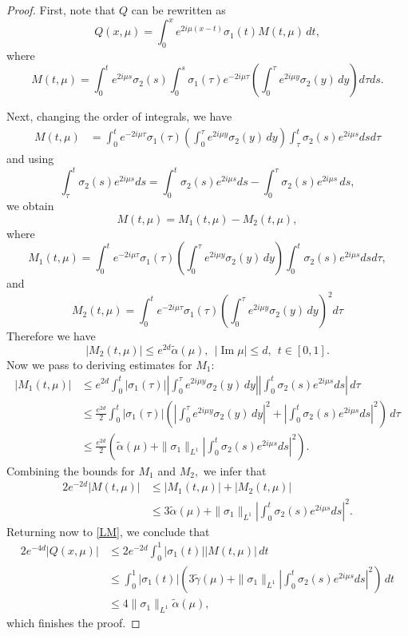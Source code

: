 \documentclass[10pt,a4paper]{amsart}
\renewcommand\Im{\operatorname{Im}}
\begin{document}
\begin{proof}
First, note that $Q$ can be rewritten as
\begin{equation}\label{LM}
Q(x,\mu)=\int_0^x e^{2i\mu(x-t)}\sigma_1(t)M(t,\mu)\,dt,
\end{equation}
where
\[
M(t,\mu)=\int_0^t e^{2i\mu s} \sigma_2(s)\int_0^s\sigma_1(\tau)e^{-2i\mu \tau}
\left(\int_0^\tau e^{2i\mu y}\sigma_2(y)\,dy\right)
 d\tau ds.
\]

Next, changing the order of integrals, we have
\begin{align*}
M(t,\mu)
&=\int_0^t e^{-2i\mu\tau} \sigma_1(\tau)
\left(\int_0^\tau e^{2i\mu y}\sigma_2(y)\,dy\right)
\int_\tau^t\sigma_2(s)e^{2i\mu s}
ds d\tau
\end{align*}
and using
\[
\int_\tau^t\sigma_2(s) e^{2i\mu s}
ds =\int_0^t\sigma_2(s)e^{2i\mu s}
ds -\int_0^\tau\sigma_2(s)e^{2i\mu s}\,ds,
\]
we obtain
\[
M(t,\mu)=M_1(t,\mu)-M_2(t,\mu),
\]
where
\[
M_1(t,\mu)=\int_0^t e^{-2i\mu\tau} \sigma_1(\tau)
\left(\int_0^\tau e^{2i\mu y}\sigma_2(y)\,dy\right)
\int_0^t\sigma_2(s)e^{2i\mu s}
ds d\tau,
\]
and
\[M_2(t,\mu)=\int_0^t e^{-2i\mu\tau} \sigma_1(\tau)
\left(\int_0^\tau e^{2i\mu y}\sigma_2(y)\,dy\right)^2
d\tau
\]
Therefore we have
\[
|M_2(t,\mu)|\le e^{2d}\widetilde{\alpha}(\mu), \ \ |\Im \mu| \leq d, \ \  t\in [0,1].
\]
Now we pass to deriving estimates for  $M_1:$
\begin{align*}
|M_1(t,\mu)|&\le e^{2d}\int_0^t |\sigma_1(\tau)|
\left|\int_0^\tau e^{2i\mu y}\sigma_2(y)\,dy\right|
\left|\int_0^t\sigma_2(s)e^{2i\mu s}
ds\right|\, d\tau\\
&\le \frac{e^{2d}}{2}\int_0^t |\sigma_1(\tau)|\left(
\left|\int_0^\tau e^{2i\mu y}\sigma_2(y)\,dy\right|^2+
\left|\int_0^t\sigma_2(s)e^{2i\mu s}
ds\right|^2\right)\, d\tau\\
&\le \frac{e^{2d}}{2}\left(\widetilde{\alpha}(\mu)+\|\sigma_1\|_{L^1}
\left|\int_0^t\sigma_2(s)e^{2i\mu s}
ds\right|^2\right).
\end{align*}
Combining the bounds for $M_1$ and $M_2,$
we infer that
\begin{align*}
2 e^{-2d}|M(t,\mu)|&\le |M_1(t,\mu)|+|M_2(t,\mu)|\\
&\le 3\widetilde{\alpha}(\mu)+
 \|\sigma_1\|_{L^1}
\left|\int_0^t\sigma_2(s)e^{2i\mu s}
ds\right|^2.
\end{align*}
Returning now to \eqref{LM}, we conclude that
\begin{align*}
2 e^{-4d}|Q(x,\mu)|&\le 2 e^{-2d}\int_0^1 |\sigma_1(t)||M(t,\mu)|\,dt
\\
&\le\int_0^1|\sigma_1(t)|
\left(3\tilde{\gamma}(\mu)+\|\sigma_1\|_{L^1}
\left|\int_0^t\sigma_2(s)e^{2i\mu s}
ds\right|^2\right)\,dt
\\
&\le 4\|\sigma_1\|_{L^1}\widetilde{\alpha}(\mu),
\end{align*}
which finishes the proof.
\end{proof}
\end{document}
